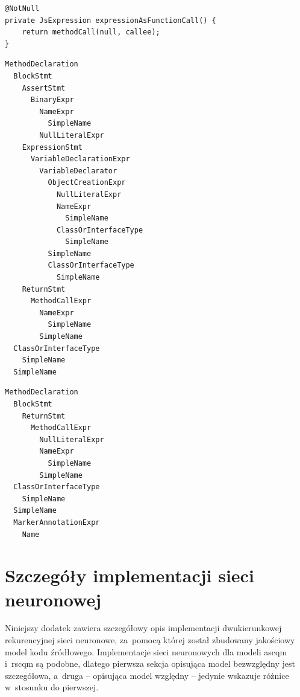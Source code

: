 \documentclass[twoside]{praca}
\begin{document}
\begin{lstlisting}[frame=single,caption={Przykładowa metoda poddana refaktoryzacji: kod po zmianie},captionpos=b,label={lst:impl:example-code-after}]
@NotNull
private JsExpression expressionAsFunctionCall() {
    return methodCall(null, callee);
}
\end{lstlisting}
\pagebreak
\begin{lstlisting}[frame=single,caption={Przykładowa metoda poddana refaktoryzacji: rozbiór syntaktyczny przed zmianą},captionpos=b,label={lst:impl:example-ast-before}]
MethodDeclaration
  BlockStmt
    AssertStmt
      BinaryExpr
        NameExpr
          SimpleName
        NullLiteralExpr
    ExpressionStmt
      VariableDeclarationExpr
        VariableDeclarator
          ObjectCreationExpr
            NullLiteralExpr
            NameExpr
              SimpleName
            ClassOrInterfaceType
              SimpleName
          SimpleName
          ClassOrInterfaceType
            SimpleName
    ReturnStmt
      MethodCallExpr
        NameExpr
          SimpleName
        SimpleName
  ClassOrInterfaceType
    SimpleName
  SimpleName
\end{lstlisting}
\pagebreak
\begin{lstlisting}[frame=single,caption={Przykładowa metoda poddana refaktoryzacji: rozbiór syntaktyczny po zmianie},captionpos=b,label={lst:impl:example-ast-after}]
MethodDeclaration
  BlockStmt
    ReturnStmt
      MethodCallExpr
        NullLiteralExpr
        NameExpr
          SimpleName
        SimpleName
  ClassOrInterfaceType
    SimpleName
  SimpleName
  MarkerAnnotationExpr
    Name
\end{lstlisting}


\clearpage
\section{Szczegóły implementacji sieci neuronowej}
\label{apdx:scqm-impl}
\setcounter{table}{0}
\renewcommand{\thetable}{C.\arabic{table}}
\setcounter{figure}{0}
\renewcommand{\thefigure}{C.\arabic{figure}}
\setcounter{lstlisting}{0}
\renewcommand{\thelstlisting}{C.\arabic{lstlisting}}

Niniejszy dodatek zawiera szczegółowy opis implementacji dwukierunkowej rekurencyjnej sieci neuronowe, za~pomocą której został zbudowany jakościowy model kodu źródłowego. Implementacje sieci neuronowych dla modeli \gls{ascqm} i~\gls{rscqm} są podobne, dlatego pierwsza sekcja opisująca model bezwzględny jest szczegółowa, a~druga -- opisująca model względny -- jedynie wskazuje różnice w~stosunku do pierwszej.
\end{document}
